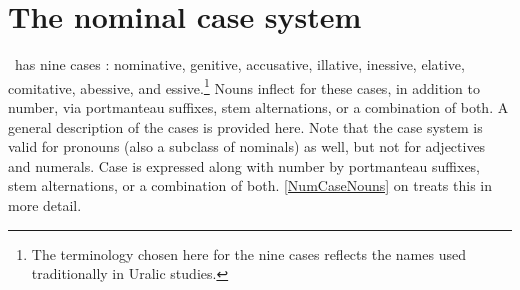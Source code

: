 \section{The nominal case system}\label{case}
\PS\ has nine cases%
: nominative, genitive, accusative, illative, inessive, elative, comitative, abessive, and essive.\footnote{The terminology chosen here for the nine cases reflects the names used traditionally in Uralic studies.} 
Nouns inflect for these cases, in addition to number, via portmanteau suffixes, stem alternations, or a combination of both. %
A general description of the cases is provided here. %
Note that the case system is valid for pronouns (also a subclass of nominals) as well, but not for adjectives and numerals. %
Case is expressed along with number by portmanteau suffixes, stem alternations, or a combination of both. %
\SEC\ref{NumCaseNouns} on treats this in more detail.

